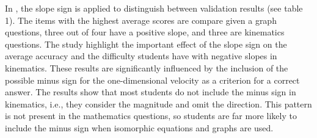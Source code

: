 \documentclass[11pt]{book}
\begin{document}
In \cite{ceuppens20199th}, the slope sign is applied to distinguish between validation results (see table 1). The items with the highest
average scores are \textquotedbl compare given a graph\textquotedbl{}
questions, three out of four have a positive slope, and three are
kinematics questions. The study highlight the important effect
of the slope sign on the average accuracy and the difficulty students
have with negative slopes in kinematics. These results are significantly influenced by the inclusion of the possible minus sign for the
one-dimensional velocity as a criterion for a correct answer. The
results show that most students do not include the minus sign in kinematics,
i.e., they consider the magnitude and omit the direction. This pattern
is not present in the mathematics questions, so students are far more
likely to include the minus sign when isomorphic equations and graphs
are used. 
\end{document}
